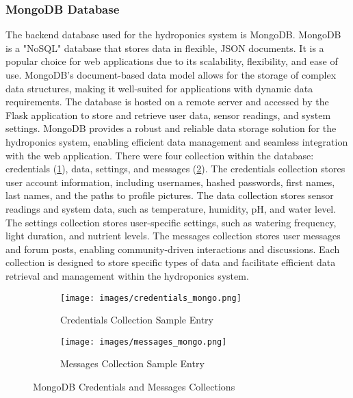 \documentclass[12pt]{article} %
\begin{document}
\subsubsection{MongoDB Database}
\noindent The backend database used for the hydroponics system is MongoDB. MongoDB is a "NoSQL" database that stores data in flexible, JSON documents. It is a popular choice for web applications due to its scalability, flexibility, and ease of use. MongoDB's document-based data model allows for the storage of complex data structures, making it well-suited for applications with dynamic data requirements. The database is hosted on a remote server and accessed by the Flask application to store and retrieve user data, sensor readings, and system settings. MongoDB provides a robust and reliable data storage solution for the hydroponics system, enabling efficient data management and seamless integration with the web application.
\newline
\newline
\noindent There were four collection within the database: credentials (\ref{fig:mongoDBCreds}), data, settings, and messages (\ref{fig:mongoDBMsgs}). The credentials collection stores user account information, including usernames, hashed passwords, first names, last names, and the paths to profile pictures. The data collection stores sensor readings and system data, such as temperature, humidity, pH, and water level. The settings collection stores user-specific settings, such as watering frequency, light duration, and nutrient levels. The messages collection stores user messages and forum posts, enabling community-driven interactions and discussions. Each collection is designed to store specific types of data and facilitate efficient data retrieval and management within the hydroponics system.
\begin{figure}[H]
    \centering
    \begin{subfigure}[c]{0.85\textwidth}
        \centering
        \texttt{[image: images/credentials\_mongo.png]}
        \caption{Credentials Collection Sample Entry}
        \label{fig:mongoDBCreds}
    \end{subfigure}
    \hfill
    \begin{subfigure}[c]{0.85\textwidth}
        \centering
        \texttt{[image: images/messages\_mongo.png]}
        \caption{Messages Collection Sample Entry}
        \label{fig:mongoDBMsgs}
    \end{subfigure}
    \caption{MongoDB Credentials and Messages Collections}
    \label{fig:mongo}
\end{figure}
\pagebreak
\end{document}
